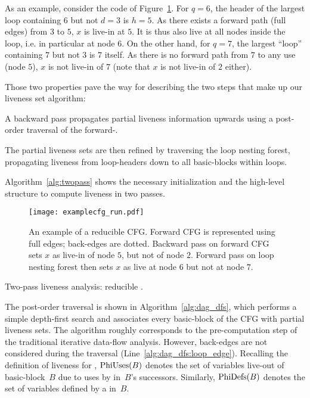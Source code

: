 As an example, consider the code of Figure~\ref{fig:examplecfg_run}. For $q=6$, the header of the largest loop containing $6$ but not $d=3$ is $h=5$. As there exists a forward path (full edges) from $3$ to $5$, $x$ is live-in at $5$. It is thus also live at all nodes inside the loop, i.e. in particular at node $6$. On the other hand, for $q=7$, the largest ``loop'' containing $7$ but not $3$ is $7$ itself. As there is no forward path from $7$ to any use (node $5$), $x$ is not live-in of $7$ (note that $x$ is not live-in of $2$ either).

Those two properties pave the way for describing the two steps that make up our liveness set algorithm:
\begin{compactenum}
\item
	A backward pass propagates partial liveness information upwards using a post-order traversal of the forward-\@CFG.
\item
	The partial liveness sets are then refined by traversing the loop nesting forest, propagating liveness from loop-headers down to all basic-blocks within loops.
\end{compactenum}
Algorithm~\ref{alg:twopass} shows the necessary initialization and the high-level structure to compute liveness in two passes.

\begin{figure}[t]
   \begin{center}
       \texttt{[image: examplecfg\_run.pdf]}
       \caption{An example of a reducible CFG. Forward CFG is represented using full edges; back-edges are dotted. Backward pass on forward CFG sets $x$ as live-in of node $5$, but not of node $2$. Forward pass on loop nesting forest then sets $x$ as live at node $6$ but not at node $7$. }
       \label{fig:examplecfg_run}
   \end{center}
\end{figure}

\begin{algorithm}[H]
    \caption{Two-pass liveness analysis: reducible \@CFG.}
  \label{alg:twopass}
\end{algorithm}

The post-order traversal is shown in Algorithm~\ref{alg:dag_dfs}, which performs a simple depth-first search and associates every basic-block of the CFG with partial liveness sets.
The algorithm roughly corresponds to the pre-computation step of the traditional iterative data-flow analysis.
However, back-edges are not considered during the traversal (Line~\ref{alg:dag_dfs:loop_edge}).
Recalling the definition of liveness for \phifuns, $\textrm{PhiUses}(B)$ denotes the set of variables live-out of basic-block~$B$ due to uses by \phifuns in~$B$'s successors.
Similarly, $\textrm{PhiDefs}(B)$ denotes the set of variables defined by a \phifun in~$B$.

